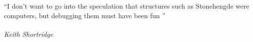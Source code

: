 \clearpage

\narrowlinespacing

\vspace*{4mm}

``I don't want to go into the speculation that structures such as Stonehengde were computers, but debugging them must have been fun ''
\\
\\
\emph{Keith Shortridge}

\normallinespacing
